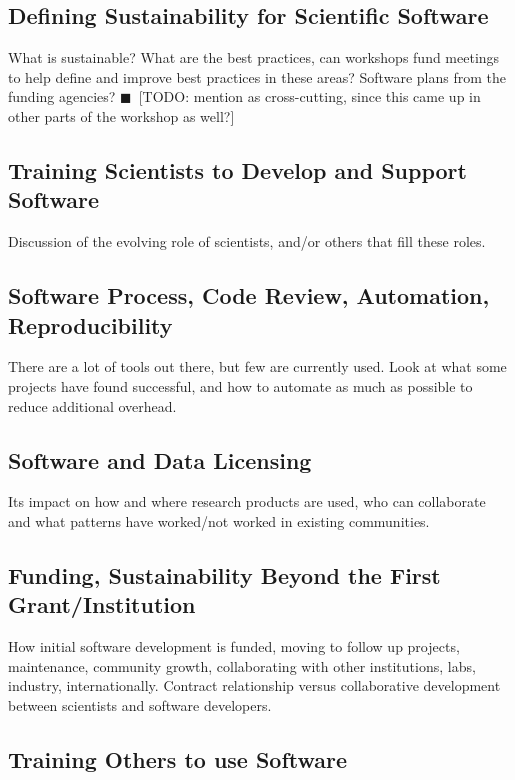 \documentclass[11pt, oneside]{amsart}
\newcommand{\todo}[1]{{\color{blue}$\blacksquare$~\textsf{[TODO: #1]}}}
\begin{document}
\subsection{Defining Sustainability for Scientific Software}

What is sustainable? What are the best practices, can workshops fund meetings to help define and improve best practices in these areas? Software plans from the funding agencies? \todo{mention as cross-cutting, since this came up in other parts of the workshop as well?}


\subsection{Training Scientists to Develop and Support Software}

Discussion of the evolving role of scientists, and/or others that fill these roles.

\subsection{Software Process, Code Review, Automation, Reproducibility}

There are a lot of tools out there, but few are currently used. Look at what some projects have found successful, and how to automate as much as possible to reduce additional overhead.

\subsection{Software and Data Licensing}

Its impact on how and where research products are used, who can collaborate and what patterns have worked/not worked in existing communities.

\subsection{Funding, Sustainability Beyond the First Grant/Institution}

How initial software development is funded, moving to follow up projects, maintenance, community growth, collaborating with other institutions, labs, industry, internationally. Contract relationship versus collaborative development between scientists and software developers.

\subsection{Training Others to use Software}
\end{document}
